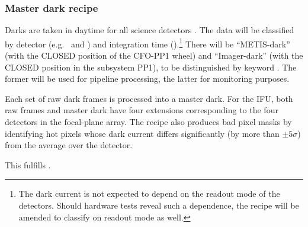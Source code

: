 \clearpage

\subsubsection{Master dark recipe }
\label{sssec:metis_det_dark}
\label{rec:det_dark}
\label{rec:metis_det_dark}

Darks are taken in daytime for all science detectors
\cite{METIS-calibration_plan}. The data will be classified by detector
(e.g.~ and ) and integration time
().\footnote{The dark current is not expected to depend on the readout mode of the detectors. Should hardware tests reveal such a dependence, the recipe will be amended to classify on readout mode as well.} There will be ``METIS-dark''
(with the CLOSED position of the CFO-PP1 wheel) and ``Imager-dark''
(with the CLOSED position in the subsystem PP1), to be distinguished
by keyword \TBD. The former will be used for pipeline processing, the
latter for monitoring purposes.

Each set of raw dark frames is processed into a master dark. For the
IFU, both raw frames and master dark have four extensions
corresponding to the four detectors in the focal-plane array. The
recipe also produces bad pixel masks by identifying hot pixels whose
dark current differs significantly (by more than $\pm 5\sigma$) from
the average over the detector.

This fulfills .

